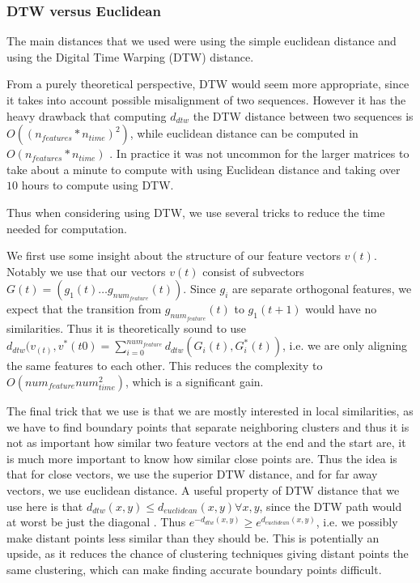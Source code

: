 \subsubsection{DTW versus Euclidean}
The main distances that we used were  using the simple euclidean distance and using the Digital Time Warping (DTW) distance. 

From a purely theoretical perspective, DTW would seem more appropriate, since it takes into account possible misalignment of two sequences. However it has the heavy drawback that computing $d_{dtw}$ the DTW distance between two sequences is $O((n_{features}*n_{time})^2)$, while euclidean distance can be computed in $O(n_{features}*n_{time})$ . In practice it was not uncommon for the larger matrices to take about a minute to compute with using Euclidean distance and taking over $10$ hours to compute using DTW.

Thus when considering using DTW, we use several tricks to reduce the time needed for computation.

We first use some insight about the structure of our feature vectors $v(t)$. Notably we use that our vectors $v(t)$ consist of subvectors $G(t)=(g_1(t) \ldots g_{num_{feature}}(t))$. Since $g_i$ are separate orthogonal features, we expect that the transition from $g_{num_{feature}}(t)$ to $g_1(t+1)$ would have no similarities.  Thus it is theoretically sound to use $d_{dtw}(v_(t),v^*(t0)=\sum\limits_{i=0}^{num_{feature}} d_{dtw} (G_i(t),G^*_i (t))$, i.e. we are only aligning the same features to each other. This reduces the complexity to $O(num_{feature}num_{time}^2)$, which is a significant gain. 

The final trick that we use is that we are mostly interested in local similarities, as we have to find boundary points that separate neighboring clusters and thus it is not as important how similar two feature vectors at the end and the start are, it is much more important to know how similar close points are. Thus the idea is that for close vectors, we use the superior DTW distance, and for far away vectors, we use euclidean distance. 
A useful property of DTW distance that we use here is that $d_{dtw}(x,y)\leq d_{euclidean}(x,y) \forall x,y$, since  the DTW path would at worst be just the diagonal . Thus $e^{-d_{dtw}(x,y)}\geq e^{d_{euclidean}(x,y)}$, i.e. we possibly make distant points less similar than they should be. This is potentially an upside, as it reduces the chance of clustering techniques giving distant points the same clustering, which can make finding accurate boundary points difficult.

